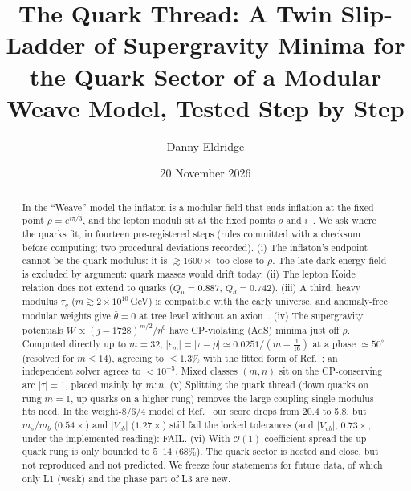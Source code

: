 \documentclass[aps,prd,twocolumn,superscriptaddress,nofootinbib,showkeys]{revtex4-2}
\begin{document}
\title{The Quark Thread: A Twin Slip-Ladder of Supergravity Minima for the Quark Sector of a Modular Weave Model, Tested Step by Step}
\author{Danny Eldridge}
\date{20 November 2026}
\begin{abstract}
In the ``Weave'' model the inflaton is a modular field that ends inflation at the fixed point $\rho=e^{i\pi/3}$, and the lepton moduli sit at the fixed points $\rho$ and $i$~\cite{P1,P2}. We ask where the quarks fit, in fourteen pre-registered steps (rules committed with a checksum before computing; two procedural deviations recorded).
(i) The inflaton's endpoint cannot be the quark modulus: it is $\gtrsim1600\times$ too close to $\rho$. The late dark-energy field is excluded by argument: quark masses would drift today.
(ii) The lepton Koide relation does not extend to quarks ($Q_u=0.887$, $Q_d=0.742$).
(iii) A third, heavy modulus $\tau_q$ ($m\gtrsim2\times10^{10}$\,GeV) is compatible with the early universe, and anomaly-free modular weights give $\bar\theta=0$ at tree level without an axion~\cite{FST,FPST}.
(iv) The supergravity potentials $W\propto(j-1728)^{m/2}/\eta^6$ have CP-violating (AdS) minima just off $\rho$. Computed directly up to $m=32$, $|\epsilon_m|=|\tau-\rho|\simeq0.0251/(m+\tfrac1{16})$ at a phase $\simeq50^\circ$ (resolved for $m\le14$), agreeing to $\le1.3\%$ with the fitted form of Ref.~\cite{NPP}; an independent solver agrees to $<10^{-5}$. Mixed classes $(m,n)$ sit on the CP-conserving arc $|\tau|=1$, placed mainly by $m{:}n$.
(v) Splitting the quark thread (down quarks on rung $m=1$, up quarks on a higher rung) removes the large coupling single-modulus fits need. In the weight-8/6/4 model of Ref.~\cite{PT} our score drops from 20.4 to 5.8, but $m_s/m_b$ ($0.54\times$) and $|V_{cb}|$ ($1.27\times$) still fail the locked tolerances (and $|V_{ub}|$, $0.73\times$, under the implemented reading): FAIL.
(vi) With $\mathcal O(1)$ coefficient spread the up-quark rung is only bounded to $5$--$14$ (68\%).
The quark sector is hosted and close, but not reproduced and not predicted. We freeze four statements for future data, of which only L1 (weak) and the phase part of L3 are new.
\end{abstract}
\maketitle
\end{document}
